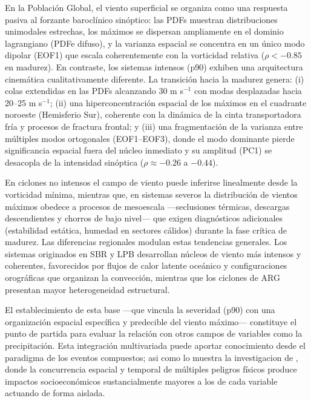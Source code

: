En la Población Global, el viento superficial se organiza como una respuesta pasiva al forzante baroclínico sinóptico: las PDFs muestran distribuciones unimodales estrechas, los máximos se dispersan ampliamente en el dominio lagrangiano (PDFe difuso), y la varianza espacial se concentra en un único modo dipolar (EOF1) que escala coherentemente con la vorticidad relativa ($\rho < -0.85$ en madurez). 
En contraste, los sistemas intensos (p90) exhiben una arquitectura cinemática cualitativamente diferente. 
La transición hacia la madurez genera: 
(i) colas extendidas en las PDFs alcanzando 30 m s$^{-1}$ con modas desplazadas hacia 20–25 m s$^{-1}$; 
(ii) una hiperconcentración espacial de los máximos en el cuadrante noroeste (Hemisferio Sur), coherente con la dinámica de la cinta transportadora fría y procesos de fractura frontal; y 
(iii) una fragmentación de la varianza entre múltiples modos ortogonales (EOF1–EOF3), donde el modo dominante pierde significancia espacial fuera del núcleo inmediato y su amplitud (PC1) se desacopla de la intensidad sinóptica ($\rho \approx -0.26$ a $-0.44$). 

En ciclones no intensos el campo de viento puede inferirse linealmente desde la vorticidad mínima, mientras que, en sistemas severos la distribución de vientos máximos obedece a procesos de mesoescala —seclusiones térmicas, descargas descendientes y chorros de bajo nivel— que exigen diagnósticos adicionales (estabilidad estática, humedad en sectores cálidos) durante la fase crítica de madurez. 
Las diferencias regionales modulan estas tendencias generales. 
Los sistemas originados en SBR y LPB desarrollan núcleos de viento más intensos y coherentes, favorecidos por flujos de calor latente oceánico y configuraciones orográficas que organizan la convección, mientras que los ciclones de ARG presentan mayor heterogeneidad estructural.

El establecimiento de esta base —que vincula la severidad (p90) con una organización espacial específica y predecible del viento máximo— constituye el punto de partida para evaluar la relación con otros campos de variables como la precipitación. 
Esta integración multivariada puede aportar conocimiento desde el paradigma de los eventos compuestos; asi como lo muestra la investigacion de \citet{zscheischler2018future}, donde la concurrencia espacial y temporal de múltiples peligros físicos produce impactos socioeconómicos sustancialmente mayores a los de cada variable actuando de forma aislada.
